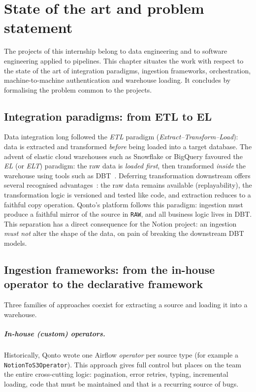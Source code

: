 \chapter{State of the art and problem statement}\label{ch:sota}

The projects of this internship belong to data engineering and to software engineering applied to pipelines. This chapter situates the work with respect to the state of the art of integration paradigms, ingestion frameworks, orchestration, machine-to-machine authentication and warehouse loading. It concludes by formalising the problem common to the projects.

\section{Integration paradigms: from ETL to EL}

Data integration long followed the \emph{ETL} paradigm (\emph{Extract–Transform–Load}): data is extracted and transformed \emph{before} being loaded into a target database. The advent of elastic cloud warehouses such as Snowflake or BigQuery favoured the \emph{EL} (or \emph{ELT}) paradigm: the raw data is \emph{loaded first}, then transformed \emph{inside} the warehouse using tools such as DBT~\cite{dbt-docs}. Deferring transformation downstream offers several recognised advantages~\cite{kleppmann}: the raw data remains available (replayability), the transformation logic is versioned and tested like code, and extraction reduces to a faithful copy operation. Qonto's platform follows this paradigm: ingestion must produce a faithful mirror of the source in \texttt{RAW}, and all business logic lives in DBT. This separation has a direct consequence for the Notion project: an ingestion \emph{must not} alter the shape of the data, on pain of breaking the downstream DBT models.

\section{Ingestion frameworks: from the in-house operator to the declarative framework}

Three families of approaches coexist for extracting a source and loading it into a warehouse.

\paragraph{In-house (custom) operators.} Historically, Qonto wrote one Airflow \emph{operator} per source type (for example a \texttt{NotionToS3Operator}). This approach gives full control but places on the team the entire cross-cutting logic: pagination, error retries, typing, incremental loading, code that must be maintained and that is a recurring source of bugs.

